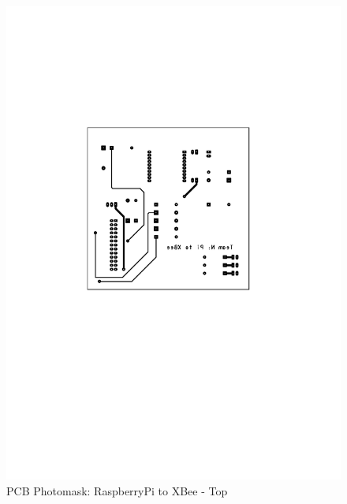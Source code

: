 \begin{figure}[H]
\begin{center}
\includegraphics[scale=0.6]{figures/Pi2XBee_top}
\end{center}
\caption{PCB Photomask: RaspberryPi to XBee - Top}
\label{fig:Pi2XBee3}
\end{figure}
